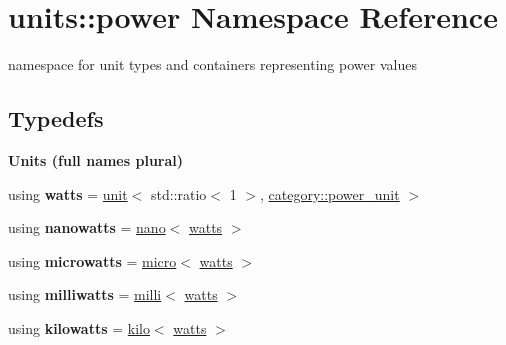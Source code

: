 \hypertarget{namespaceunits_1_1power}{}\section{units\+:\+:power Namespace Reference}
\label{namespaceunits_1_1power}


namespace for unit types and containers representing power values  


\subsection*{Typedefs}
\begin{Indent}{\bf Units (full names plural)}\par
\begin{DoxyCompactItemize}
\item 
\hypertarget{namespaceunits_1_1power_a6232d39f786a94baa870c7c665966da7}{}using {\bfseries watts} = \hyperlink{structunits_1_1unit}{unit}$<$ std\+::ratio$<$ 1 $>$, \hyperlink{namespaceunits_1_1category_aa595eeccb878cce2d88a3509aab0b2a6}{category\+::power\+\_\+unit} $>$\label{namespaceunits_1_1power_a6232d39f786a94baa870c7c665966da7}

\item 
\hypertarget{namespaceunits_1_1power_a8d82e971322644c379bbd437653e203a}{}using {\bfseries nanowatts} = \hyperlink{group___unit_manipulators_ga1c25c3c1d6c1f3aed3fd1ecf043110d5}{nano}$<$ \hyperlink{structunits_1_1unit}{watts} $>$\label{namespaceunits_1_1power_a8d82e971322644c379bbd437653e203a}

\item 
\hypertarget{namespaceunits_1_1power_a61040a706ddf0b0004d6c0e4ed661847}{}using {\bfseries microwatts} = \hyperlink{group___unit_manipulators_gaea53c906ec805110b93f02db4a961971}{micro}$<$ \hyperlink{structunits_1_1unit}{watts} $>$\label{namespaceunits_1_1power_a61040a706ddf0b0004d6c0e4ed661847}

\item 
\hypertarget{namespaceunits_1_1power_aa385eb1a68e263a9f7c80be29bdc268b}{}using {\bfseries milliwatts} = \hyperlink{group___unit_manipulators_gaec9d1c320e180eb59f3cb3094d8079dd}{milli}$<$ \hyperlink{structunits_1_1unit}{watts} $>$\label{namespaceunits_1_1power_aa385eb1a68e263a9f7c80be29bdc268b}

\item 
\hypertarget{namespaceunits_1_1power_acec1eeb6de962773299b15c427b512e4}{}using {\bfseries kilowatts} = \hyperlink{group___unit_manipulators_ga89965a45aaa6689548b9c53858759c5e}{kilo}$<$ \hyperlink{structunits_1_1unit}{watts} $>$\label{namespaceunits_1_1power_acec1eeb6de962773299b15c427b512e4}


\end{DoxyCompactItemize}
\end{Indent}
